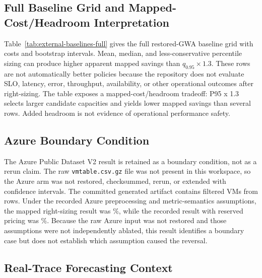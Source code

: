 \documentclass[11pt]{article}
\begin{document}
\subsection{Full Baseline Grid and Mapped-Cost/Headroom Interpretation}

Table~\ref{tab:external-baselines-full} gives the full restored-GWA baseline
grid with costs and bootstrap intervals. Mean, median, and less-conservative
percentile sizing can produce higher apparent mapped savings than
$q_{0.95}\times1.3$. These rows are not automatically better policies because
the repository does not evaluate SLO, latency, error, throughput, availability,
or other operational outcomes after right-sizing. The table exposes a
mapped-cost/headroom tradeoff: P95 x 1.3 selects larger candidate capacities
and yields lower mapped savings than several rows. Added headroom is not
evidence of operational performance safety.

\begin{table}[t]
\caption{Full Study II restored-GWA baseline grid. Savings are relative to the
lift-and-shift mapping and include bootstrap 95\% intervals.}
\label{tab:external-baselines-full}
\centering
\small
\renewcommand{\arraystretch}{1.04}
\setlength{\tabcolsep}{3pt}

\end{table}

\subsection{Azure Boundary Condition}

The Azure Public Dataset V2 result is retained as a boundary condition, not as
a rerun claim. The raw \texttt{vmtable.csv.gz} file was not present in this
workspace, so the Azure arm was not restored, checksummed, rerun, or extended
with confidence intervals. The committed generated artifact contains
\azVms{} filtered VMs from \azTotalRows{} rows. Under the recorded Azure
preprocessing and metric-semantics assumptions, the mapped right-sizing result
was \azSavingsPct\%, while the recorded result with reserved pricing was
\azSavingsPctRi\%. Because the raw Azure input was not restored and those
assumptions were not independently ablated, this result identifies a boundary
case but does not establish which assumption caused the reversal.

\subsection{Real-Trace Forecasting Context}
\end{document}
